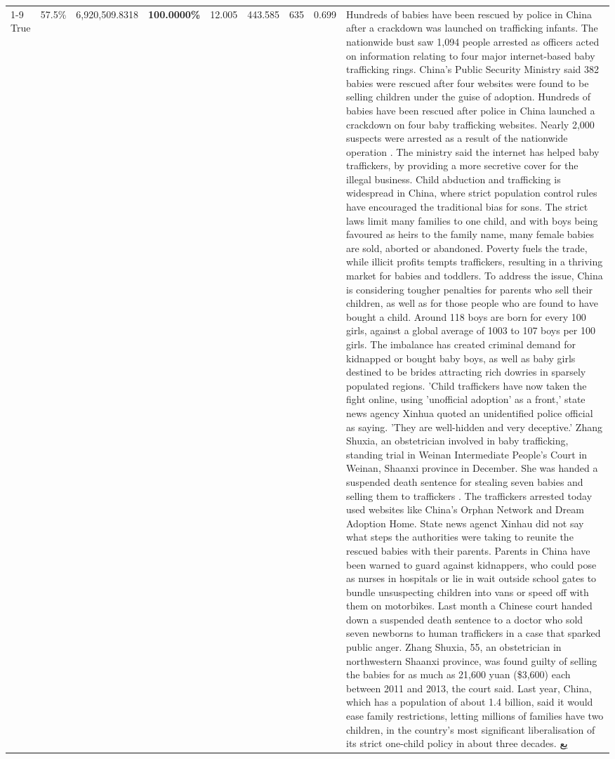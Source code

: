 \begin{table}[H]
\begin{tabular}{lllrlllll}
\cline{1-9}
True & 57.5\% & 6,920,509.8318 & \bfseries \color{red} 100.0000\% & 12.005 & 443.585 & 635 & 0.699 & Hundreds of babies have been rescued by police in China after a crackdown was launched on trafficking infants. The nationwide bust saw 1,094 people arrested as officers acted on information relating to four major internet-based baby trafficking rings. China's Public Security Ministry said 382 babies were rescued after four websites were found to be selling children under the guise of adoption. Hundreds of babies have been rescued after police in China launched a crackdown on four baby trafficking websites. Nearly 2,000 suspects were arrested as a result of the nationwide operation . The ministry said the internet has helped baby traffickers, by providing a more secretive cover for the illegal business. Child abduction and trafficking is widespread in China, where strict population control rules have encouraged the traditional bias for sons. The strict laws limit many families to one child, and with boys being favoured as heirs to the family name, many female babies are sold, aborted or abandoned. Poverty fuels the trade, while illicit profits tempts traffickers, resulting in a thriving market for babies and toddlers. To address the issue, China is considering tougher penalties for parents who sell their children, as well as for those people who are found to have bought a child. Around 118 boys are born for every 100 girls, against a global average of 1003 to 107 boys per 100 girls. The imbalance has created criminal demand for kidnapped or bought baby boys, as well as baby girls destined to be brides attracting rich dowries in sparsely populated regions. 'Child traffickers have now taken the fight online, using 'unofficial adoption' as a front,' state news agency Xinhua quoted an unidentified police official as saying. 'They are well-hidden and very deceptive.' Zhang Shuxia, an obstetrician involved in baby trafficking, standing trial in Weinan Intermediate People's Court in Weinan, Shaanxi province in December. She was handed a suspended death sentence for stealing seven babies and selling them to traffickers . The traffickers arrested today used websites like China's Orphan Network and Dream Adoption Home. State news agenct Xinhau did not say what steps the authorities were taking to reunite the rescued babies with their parents. Parents in China have been warned to guard against kidnappers, who could pose as nurses in hospitals or lie in wait outside school gates to bundle unsuspecting children into vans or speed off with them on motorbikes. Last month a Chinese court handed down a suspended death sentence to a doctor who sold seven newborns to human traffickers in a case that sparked public anger. Zhang Shuxia, 55, an obstetrician in northwestern Shaanxi province, was found guilty of selling the babies for as much as 21,600 yuan (\$3,600) each between 2011 and 2013, the court said. Last year, China, which has a population of about 1.4 billion, said it would ease family restrictions, letting millions of families have two children, in the country's most significant liberalisation of its strict one-child policy in about three decades. يع \\

\end{tabular}
\end{table}
